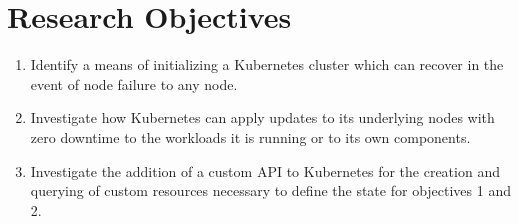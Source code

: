 \chapter{Research Objectives}

\begin{enumerate}
\item Identify a means of initializing a Kubernetes cluster which can recover in the event of node failure to any node.
\item Investigate how Kubernetes can apply updates to its underlying nodes with zero downtime to the workloads it is running or to its own components.
\item Investigate the addition of a custom API to Kubernetes for the creation and querying of custom resources necessary to define the state for objectives 1 and 2.
\end{enumerate}